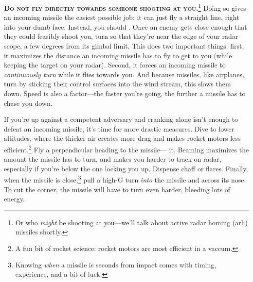 \textbf{\textsc{Do not fly directly towards someone shooting at
you.}}\punckern\footnote{Or who \emph{might} be shooting at you---we'll talk
about active radar homing \ac{(arh)} missiles shortly.}
Doing so gives an incoming missile the easiest possible job:
it can just fly a straight line, right into your dumb face.
Instead, you should .
Once an enemy gets close enough that they could feasibly shoot you,
turn so that they're near the edge of your radar scope,
a few degrees from its gimbal limit.
This does two important things:
first, it maximizes the distance an incoming missile has to fly to get to you
(while keeping the target on your radar).
Second, it forces an incoming missile to \emph{continuously turn} while it
flies towards you.
And because missiles, like airplanes, turn by sticking their control surfaces
into the wind stream, this slows them down.
Speed is also a factor---the faster you're going,
the further a missile has to chase you down.

If you're up against a competent adversary and cranking alone isn't enough to
defeat an incoming missile, it's time for more drastic measures.
Dive to lower altitudes, where the thicker air creates more drag and makes
rocket motors less efficient.\punckern\footnote{A fun bit of rocket
science: rocket motors are most efficient in a vaccum.}
Fly a perpendicular heading to the missile--- it.
Beaming maximizes the amount the missile has to turn,
and makes you harder to track on radar,
especially if you're below the one locking you up.
Dispense chaff or flares.
Finally, when the missile is close,\punckern\footnote{Knowing \emph{when} a
missile is seconds from impact comes with timing, experience, and a bit of luck.}
pull a high-G turn \emph{into} the missile and across its nose.
To cut the corner, the missile will have to turn even harder,
bleeding lots of energy.

